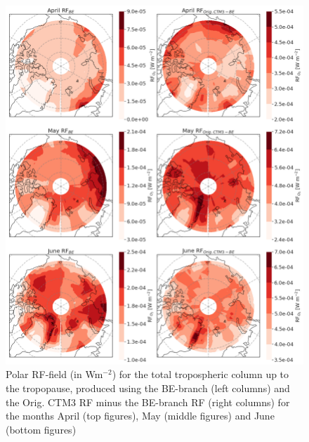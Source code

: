 \begin{figure}[ht]
    \centering
    \includegraphics{Chapter6_Results/images/RF/BEOrig_RF_polar_AprJune_2001.png}
    \caption{Polar RF-field (in Wm$^{-2}$) for the total tropospheric column up to the tropopause, produced using the BE-branch (left columns) and the Orig. CTM3 RF minus the BE-branch RF (right columns) for the months April (top figures), May (middle figures) and June (bottom figures)}
    \label{fig:BE_RF_global_AprJune_2001}
\end{figure}